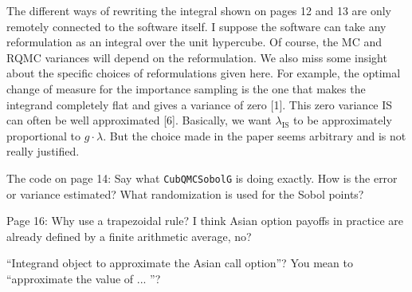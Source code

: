 \documentclass{amsart}
\begin{document}
\vspace{1cm}

The different ways of rewriting the integral shown on pages 12 and 13 are only remotely connected to the software itself. I suppose the software can take any reformulation as an integral over the unit hypercube. Of course, the MC and RQMC variances will depend on the reformulation. We also miss some insight about the specific choices of reformulations given here. For example, the optimal change of measure for the importance sampling is the one that makes the integrand completely flat and gives a variance of zero [1]. This zero variance IS can often be well approximated [6]. Basically, we want $\lambda_\text{IS}$ to be approximately proportional to $g \cdot \lambda$. But the choice made in the paper seems arbitrary and is not really justified.


\vspace{1cm}

The code on page 14: Say what \texttt{CubQMCSobolG} is doing exactly. How is the error or variance estimated? What randomization is used for the Sobol points?


\vspace{1cm}

Page 16: Why use a trapezoidal rule? I think Asian option payoffs in practice are already defined by a finite arithmetic average, no?


\vspace{1cm}

``Integrand object to approximate the Asian call option''? You mean to ``approximate the value of ... ''?

\vspace{1cm}
\end{document}
